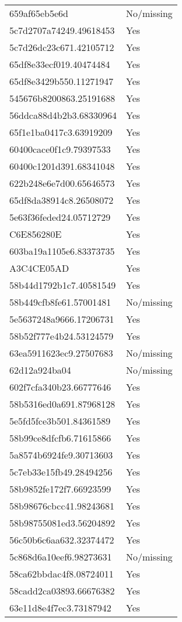 \begin{tabular}{ll}
659af65eb5e6d & No/missing \\
5c7d2707a74249.49618453 & Yes \\
5c7d26dc23c671.42105712 & Yes \\
65df8e33ecf019.40474484 & Yes \\
65df8e3429b550.11271947 & Yes \\
545676b8200863.25191688 & Yes \\
56ddca88d4b2b3.68330964 & Yes \\
65f1e1ba0417c3.63919209 & Yes \\
60400cace0f1c9.79397533 & Yes \\
60400c1201d391.68341048 & Yes \\
622b248e6e7d00.65646573 & Yes \\
65df8da38914c8.26508072 & Yes \\
5e63f36feded24.05712729 & Yes \\
C6E856280E & Yes \\
603ba19a1105e6.83373735 & Yes \\
A3C4CE05AD & Yes \\
58b44d1792b1c7.40581549 & Yes \\
58b449cfb8fe61.57001481 & No/missing \\
5e5637248a9666.17206731 & Yes \\
58b52f777e4b24.53124579 & Yes \\
63ea5911623ec9.27507683 & No/missing \\
62d12a924ba04 & No/missing \\
602f7cfa340b23.66777646 & Yes \\
58b5316ed0a691.87968128 & Yes \\
5e5fd5fce3b501.84361589 & Yes \\
58b99ce8dfcfb6.71615866 & Yes \\
5a8574b6924fe9.30713603 & Yes \\
5c7eb33e15fb49.28494256 & Yes \\
58b9852fe172f7.66923599 & Yes \\
58b98676cbcc41.98243681 & Yes \\
58b98755081ed3.56204892 & Yes \\
56c50b6c6aa632.32374472 & Yes \\
5c868d6a10eef6.98273631 & No/missing \\
58ca62bbdac4f8.08724011 & Yes \\
58cadd2ca03893.66676382 & Yes \\
63e11d8e4f7ec3.73187942 & Yes \\

\end{tabular}
